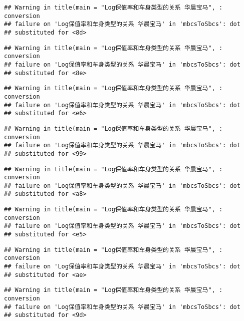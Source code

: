 \documentclass[]{article}
\begin{document}
\begin{verbatim}
## Warning in title(main = "Log保值率和车身类型的关系 华晨宝马", : conversion
## failure on 'Log保值率和车身类型的关系 华晨宝马' in 'mbcsToSbcs': dot
## substituted for <8d>
\end{verbatim}

\begin{verbatim}
## Warning in title(main = "Log保值率和车身类型的关系 华晨宝马", : conversion
## failure on 'Log保值率和车身类型的关系 华晨宝马' in 'mbcsToSbcs': dot
## substituted for <8e>
\end{verbatim}

\begin{verbatim}
## Warning in title(main = "Log保值率和车身类型的关系 华晨宝马", : conversion
## failure on 'Log保值率和车身类型的关系 华晨宝马' in 'mbcsToSbcs': dot
## substituted for <e6>
\end{verbatim}

\begin{verbatim}
## Warning in title(main = "Log保值率和车身类型的关系 华晨宝马", : conversion
## failure on 'Log保值率和车身类型的关系 华晨宝马' in 'mbcsToSbcs': dot
## substituted for <99>
\end{verbatim}

\begin{verbatim}
## Warning in title(main = "Log保值率和车身类型的关系 华晨宝马", : conversion
## failure on 'Log保值率和车身类型的关系 华晨宝马' in 'mbcsToSbcs': dot
## substituted for <a8>
\end{verbatim}

\begin{verbatim}
## Warning in title(main = "Log保值率和车身类型的关系 华晨宝马", : conversion
## failure on 'Log保值率和车身类型的关系 华晨宝马' in 'mbcsToSbcs': dot
## substituted for <e5>
\end{verbatim}

\begin{verbatim}
## Warning in title(main = "Log保值率和车身类型的关系 华晨宝马", : conversion
## failure on 'Log保值率和车身类型的关系 华晨宝马' in 'mbcsToSbcs': dot
## substituted for <ae>
\end{verbatim}

\begin{verbatim}
## Warning in title(main = "Log保值率和车身类型的关系 华晨宝马", : conversion
## failure on 'Log保值率和车身类型的关系 华晨宝马' in 'mbcsToSbcs': dot
## substituted for <9d>
\end{verbatim}
\end{document}
